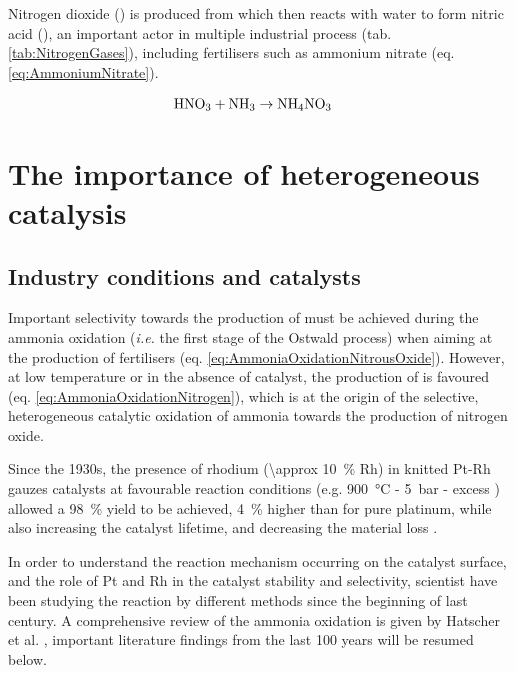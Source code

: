 Nitrogen dioxide (\nitrogendioxide) is produced from  which then reacts with water to form nitric acid (\nitricacid), an important actor in multiple industrial process (tab. \ref{tab:NitrogenGases}), including fertilisers such as ammonium nitrate (eq. \ref{eq:AmmoniumNitrate}).

\begin{align}
    \label{eq:AmmoniumNitrate}
    \nitricacid + \ammonia & \rightarrow \ammoniumnitrate
\end{align}

\section{The importance of heterogeneous catalysis}\label{sec:AmoOxiHC}

\subsection{Industry conditions and catalysts}

Important selectivity towards the production of  must be achieved during the ammonia oxidation (\textit{i.e.} the first stage of the Ostwald process) when aiming at the production of fertilisers (eq. \ref{eq:AmmoniaOxidationNitrousOxide}).
However, at low temperature or in the absence of catalyst, the production of  is favoured (eq. \ref{eq:AmmoniaOxidationNitrogen}), which is at the origin of the selective, heterogeneous catalytic oxidation of ammonia towards the production of nitrogen oxide.

Since the 1930s, the presence of rhodium (\qty{\approx 10}{\percent} Rh) in knitted Pt-Rh gauzes catalysts at favourable reaction conditions (e.g. \qty{900}{\degreeCelsius} - \qty{5}{\bar} - excess \dioxygen) allowed a \qty{98}{\percent}  yield to be achieved, \qty{4}{\percent} higher than for pure platinum, while also increasing the catalyst lifetime, and decreasing the material loss \parencite{Ostwald1908, Kaiser1909, Handforth1934, Heck1982}.

In order to understand the reaction mechanism occurring on the catalyst surface, and the role of Pt and Rh in the catalyst stability and selectivity, scientist have been studying the reaction by different methods since the beginning of last century.
A comprehensive review of the ammonia oxidation is given by Hatscher et al. \parencite*{Hatscher2008}, important literature findings from the last 100 years will be resumed below.

